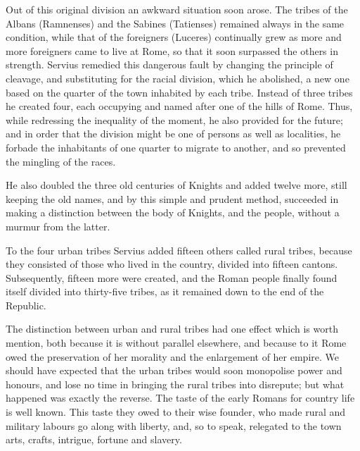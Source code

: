 \documentclass[12pt]{report}
\begin{document}
Out of this original division an awkward situation soon arose. The tribes of the Albans (Ramnenses) and the Sabines (Tatienses) remained always in the same condition, while that of the foreigners (Luceres) continually grew as more and more foreigners came to live at Rome, so that it soon surpassed the others in strength. Servius remedied this dangerous fault by changing the principle of cleavage, and substituting for the racial division, which he abolished, a new one based on the quarter of the town inhabited by each tribe. Instead of three tribes he created four, each occupying and named after one of the hills of Rome. Thus, while redressing the inequality of the moment, he also provided for the future; and in order that the division might be one of persons as well as localities, he forbade the inhabitants of one quarter to migrate to another, and so prevented the mingling of the races.

He also doubled the three old centuries of Knights and added twelve more, still keeping the old names, and by this simple and prudent method, succeeded in making a distinction between the body of Knights, and the people, without a murmur from the latter.

To the four urban tribes Servius added fifteen others called rural tribes, because they consisted of those who lived in the country, divided into fifteen cantons. Subsequently, fifteen more were created, and the Roman people finally found itself divided into thirty-five tribes, as it remained down to the end of the Republic.

The distinction between urban and rural tribes had one effect which is worth mention, both because it is without parallel elsewhere, and because to it Rome owed the preservation of her morality and the enlargement of her empire. We should have expected that the urban tribes would soon monopolise power and honours, and lose no time in bringing the rural tribes into disrepute; but what happened was exactly the reverse. The taste of the early Romans for country life is well known. This taste they owed to their wise founder, who made rural and military labours go along with liberty, and, so to speak, relegated to the town arts, crafts, intrigue, fortune and slavery.
\end{document}
